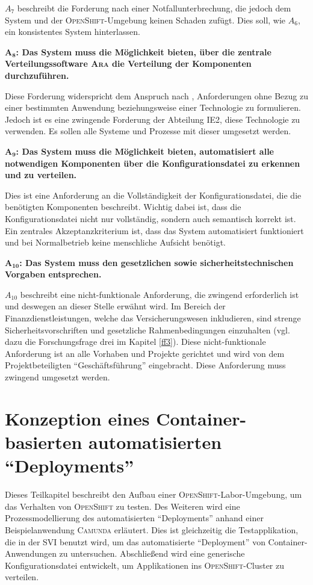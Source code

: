 \par
$A_{7}$ beschreibt die Forderung nach einer Notfallunterbrechung, die jedoch dem System und der \textsc{OpenShift}-Umgebung keinen Schaden zufügt. Dies soll, wie $A_{6}$, ein konsistentes System hinterlassen. 
\par
$\mathbf{A_{8}}$\textbf{: Das System muss die Möglichkeit bieten, über die zentrale Verteilungssoftware \textsc{Ara} die Verteilung der Komponenten durchzuführen.}
\par
Diese Forderung widerspricht dem Anspruch nach \cite{hull_requirements_2011}, Anforderungen ohne Bezug zu einer bestimmten Anwendung beziehungsweise einer Technologie zu formulieren. Jedoch ist es eine zwingende Forderung der Abteilung \ac{IE2}, diese Technologie zu verwenden. Es sollen alle Systeme und Prozesse mit dieser umgesetzt werden.
\par
$\mathbf{A_{9}}$\textbf{: Das System muss die Möglichkeit bieten, automatisiert alle notwendigen Komponenten über die Konfigurationsdatei zu erkennen und zu verteilen.}
\par
Dies ist eine Anforderung an die Vollständigkeit der Konfigurationsdatei, die die benötigten Komponenten beschreibt. Wichtig dabei ist, dass die Konfigurationsdatei nicht nur vollständig, sondern auch semantisch korrekt ist. Ein zentrales Akzeptanzkriterium ist, dass das System automatisiert funktioniert und bei Normalbetrieb keine menschliche Aufsicht benötigt.
\par
$\mathbf{A_{10}}$\textbf{: Das System muss den gesetzlichen sowie sicherheitstechnischen Vorgaben entsprechen.}
\par
$A_{10}$ beschreibt eine nicht-funktionale Anforderung, die zwingend erforderlich ist und deswegen an dieser Stelle erwähnt wird. Im Bereich der Finanzdienstleistungen, welche das Versicherungswesen inkludieren, sind strenge Sicherheitsvorschriften und gesetzliche Rahmenbedingungen einzuhalten (vgl. dazu die Forschungsfrage drei im Kapitel \vref{ff3}). Diese nicht-funktionale Anforderung ist an alle Vorhaben und Projekte gerichtet und wird von dem Projektbeteiligten \enquote{Geschäftsführung} eingebracht. Diese Anforderung muss zwingend umgesetzt werden. 

\section{Konzeption eines Container-basierten automatisierten \enquote{Deployments}}
Dieses Teilkapitel beschreibt den Aufbau einer \textsc{OpenShift}-Labor-Umgebung, um das Verhalten von \textsc{OpenShift} zu testen. Des Weiteren wird eine Prozessmodellierung des automatisierten \enquote{Deployments} anhand einer Beispielanwendung \textsc{Camunda} erläutert. Dies ist gleichzeitig die Testapplikation, die in der \ac{SVI} benutzt wird, um das automatisierte \enquote{Deployment} von Container-Anwendungen zu untersuchen. Abschließend wird eine generische Konfigurationsdatei entwickelt, um Applikationen ins \textsc{OpenShift}-Cluster zu verteilen.

